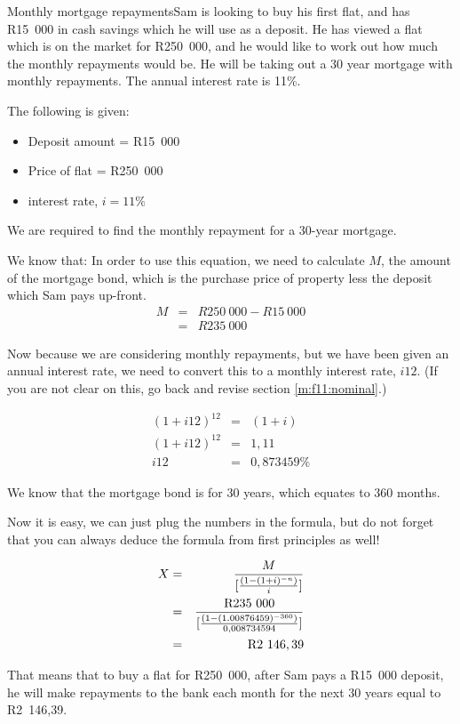 \begin{wex}{Monthly mortgage repayments}{Sam is looking to buy his first flat, and has R15~000 in cash savings which he will use as a deposit. He has viewed a flat which is on the market for R250~000, and he would like to work out how much the monthly repayments would be. He will be taking out a 30 year mortgage with monthly repayments. The annual interest rate is 11\%.}
{
The following is given:
\begin{itemize}
\item{Deposit amount = R15~000}
\item{Price of flat = R250~000}
\item{interest rate, $i=11\%$}
\end{itemize}
We are required to find the monthly repayment for a 30-year mortgage.

We know that:
In order to use this equation, we need to calculate $M$, the amount of the mortgage bond, which is the purchase price of property less the deposit which Sam pays up-front.
\begin{eqnarray*}
M &=& R250~000 - R15~000\\
&=& R235~000
\end{eqnarray*}

Now because we are considering monthly repayments, but we have been given an annual interest rate, we need to convert this to a monthly interest rate, $i12$. (If you are not clear on this, go back and revise section \ref{m:f11:nominal}.)

\begin{eqnarray*}
(1+ i12)^{12} &=& (1+i)\\
(1 + i12)^{12} &=& 1,11\\
i12 &=& 0,873459\%
\end{eqnarray*}

We know that the mortgage bond is for 30 years, which equates to 360 months.

Now it is easy, we can just plug the numbers in the formula, but do not forget that you can always deduce the formula from first principles as well!

\begin{eqnarray*}
X &=& \frac{M}{[\frac{(1-(1+i)^{-n})}{i}]}\\
&=& \frac{\rm{R}235~000}{[\frac{(1-(1.00876459)^{-360})}{0,008734594}]}\\
&=& \rm{R}2~146,39
\end{eqnarray*}

That means that to buy a flat for R250~000, after Sam pays a R15~000 deposit, he will make repayments to the bank each month for the next 30 years equal to R2~146,39.}
\end{wex}

